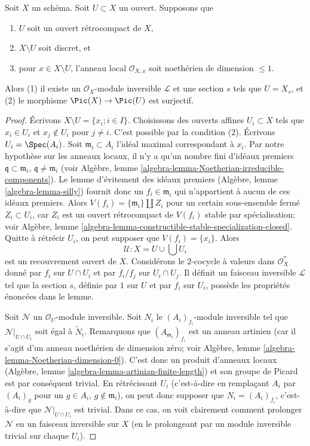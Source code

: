 \begin{lemma}
\label{lemma-complement-codim-1-closed-points}
Soit $X$ un schéma. Soit $U \subset X$ un ouvert. Supposons que
\begin{enumerate}
\item $U$ soit un ouvert rétrocompact de $X$,
\item $X \setminus U$ soit discret, et
\item pour $x \in X \setminus U$, l'anneau local
$\mathcal{O}_{X, x}$ soit noethérien de dimension $\leq 1$.
\end{enumerate}
Alors (1) il existe un $\mathcal{O}_X$-module inversible $\mathcal{L}$
et une section $s$ tels que $U = X_s$, et (2) le morphisme
$\Pic(X) \to \Pic(U)$ est surjectif.
\end{lemma}

\begin{proof}
Écrivons $X \setminus U = \{x_i; i \in I\}$.
Choisissons des ouverts affines $U_i \subset X$ tels que $x_i \in U_i$ et
$x_j \not \in U_i$ pour $j \not = i$. C'est possible par la condition (2).
Écrivons $U_i = \Spec(A_i)$. Soit $\mathfrak m_i \subset A_i$ l'idéal maximal
correspondant à $x_i$. Par notre hypothèse sur les anneaux locaux,
il n'y a qu'un nombre fini d'idéaux premiers
$\mathfrak q \subset \mathfrak m_i$,
$\mathfrak q \not = \mathfrak m_i$ (voir
Algèbre, lemme \ref{algebra-lemma-Noetherian-irreducible-components}).
Le lemme d'évitement des idéaux premiers (Algèbre, lemme
\ref{algebra-lemma-silly}) fournit donc un $f_i \in \mathfrak m_i$
qui n'appartient à aucun de ces idéaux premiers. Alors
$V(f_i) = \{\mathfrak m_i\} \amalg Z_i$ pour un certain sous-ensemble fermé
$Z_i \subset U_i$, car $Z_i$ est un ouvert rétrocompact de
$V(f_i)$ stable par spécialisation; voir
Algèbre, lemme \ref{algebra-lemma-constructible-stable-specialization-closed}.
Quitte à rétrécir $U_i$, on peut supposer que $V(f_i) = \{x_i\}$. Alors
$$
\mathcal{U} : X = U \cup \bigcup U_i
$$
est un recouvrement ouvert de $X$. Considérons le $2$-cocycle à valeurs
dans $\mathcal{O}_X^*$ donné par $f_i$ sur $U \cap U_i$ et par
$f_i/f_j$ sur $U_i \cap U_j$. Il définit un faisceau inversible
$\mathcal{L}$ tel que la section $s$, définie par $1$ sur $U$
et par $f_i$ sur $U_i$, possède les propriétés énoncées dans le lemme.

\medskip\noindent
Soit $\mathcal{N}$ un $\mathcal{O}_U$-module inversible.
Soit $N_i$ le $(A_i)_{f_i}$-module inversible tel que
$\mathcal{N}|_{U \cap U_i}$ soit égal à $\tilde N_i$.
Remarquons que $(A_{\mathfrak m_i})_{f_i}$ est un anneau artinien
(car il s'agit d'un anneau noethérien de dimension zéro; voir
Algèbre, lemme \ref{algebra-lemma-Noetherian-dimension-0}).
C'est donc un produit d'anneaux locaux
(Algèbre, lemme \ref{algebra-lemma-artinian-finite-length}) et
son groupe de Picard est par conséquent trivial. En rétrécissant $U_i$
(c'est-à-dire en remplaçant $A_i$ par $(A_i)_g$ pour un $g \in A_i$,
$g \not \in \mathfrak m_i$),
on peut donc supposer que $N_i = (A_i)_{f_i}$, c'est-à-dire que
$\mathcal{N}|_{U \cap U_i}$ est trivial. Dans ce cas, on voit clairement
comment prolonger $\mathcal{N}$ en un faisceau inversible sur $X$
(en le prolongeant par un module inversible trivial sur chaque $U_i$).
\end{proof}

